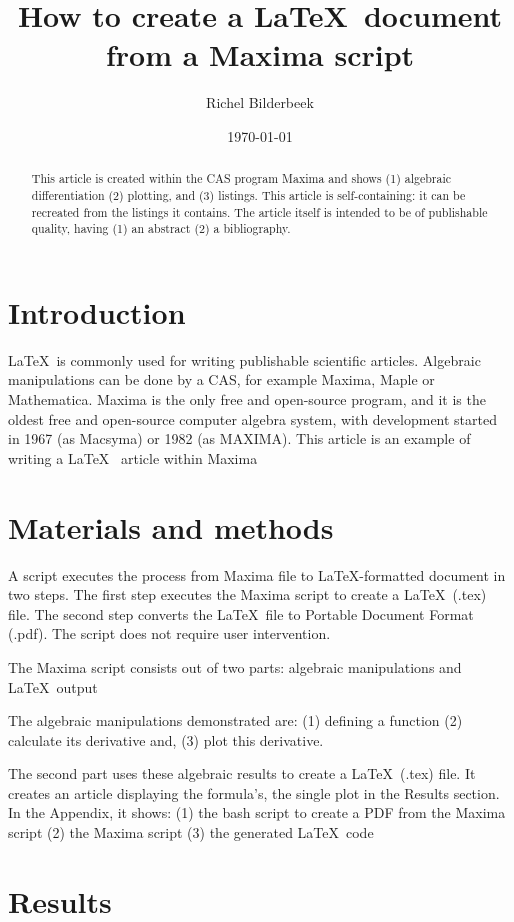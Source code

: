 \documentclass{article}
\title{How to create a \LaTeX~document from a Maxima script}
\author{Richel Bilderbeek}
\date{\today}
\begin{document}
\maketitle

\begin{abstract}
This article is created within the CAS program Maxima
and shows (1) algebraic differentiation (2) plotting, and (3) listings.
This article is self-containing: it can be recreated from the listings it contains.
The article itself is intended to be of
publishable quality, having (1) an abstract (2) a bibliography.
\end{abstract}

\section{Introduction}

\LaTeX~is commonly used for writing publishable scientific articles\cite{gaudeul2006}.
Algebraic manipulations can be done by a CAS, for example Maxima, Maple or Mathematica.
Maxima is the only free and open-source program, and it is the oldest free and open-source computer algebra system, with development started in 1967 (as Macsyma) or 1982 (as MAXIMA).
This article is an example of writing a \LaTeX~ article within Maxima

\section{Materials and methods}

A script executes the process from Maxima file to \LaTeX-formatted document in two steps.
The first step executes the Maxima script to create a \LaTeX~(.tex) file.
The second step converts the \LaTeX~file to Portable Document Format (.pdf).
The script does not require user intervention.

The Maxima script consists out of two parts:
algebraic manipulations and \LaTeX~output

The algebraic manipulations demonstrated are: 
(1) defining a function
(2) calculate its derivative and,
(3) plot this derivative.

The second part uses these algebraic results to create a \LaTeX~(.tex) file.
It creates an article displaying the formula's, the single plot in
the Results section.
In the Appendix, it shows: 
(1) the bash script to create a PDF from the Maxima script
(2) the Maxima script
(3) the generated \LaTeX~code

\section{Results}
\end{document}
